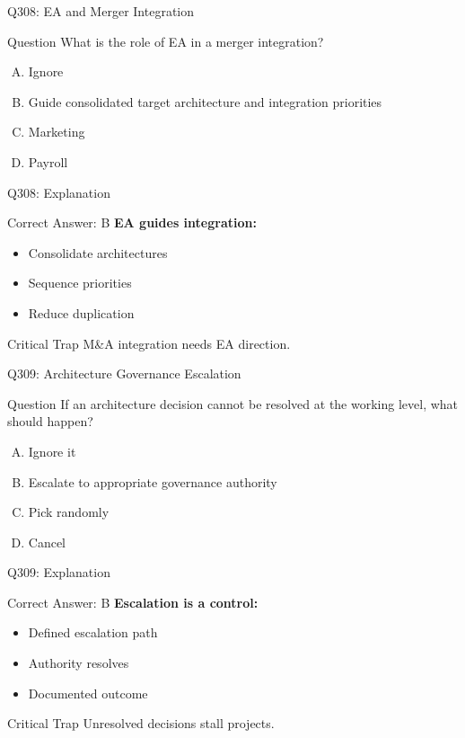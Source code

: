 \documentclass{beamer}
\begin{document}
	\begin{frame}{Q308: EA and Merger Integration}
		\begin{block}{Question}
			What is the role of EA in a merger integration?
		\end{block}
		\begin{enumerate}[(A)]
			\item Ignore
			\item Guide consolidated target architecture and integration priorities
			\item Marketing
			\item Payroll
		\end{enumerate}
	\end{frame}
	
	\begin{frame}{Q308: Explanation}
		\begin{block}{Correct Answer: B}
			\textbf{EA guides integration:}
			\begin{itemize}
				\item Consolidate architectures
				\item Sequence priorities
				\item Reduce duplication
			\end{itemize}
		\end{block}
		\begin{alertblock}{Critical Trap}
			M\&A integration needs EA direction.
		\end{alertblock}
	\end{frame}
	
	\begin{frame}{Q309: Architecture Governance Escalation}
		\begin{block}{Question}
			If an architecture decision cannot be resolved at the working level, what should happen?
		\end{block}
		\begin{enumerate}[(A)]
			\item Ignore it
			\item Escalate to appropriate governance authority
			\item Pick randomly
			\item Cancel
		\end{enumerate}
	\end{frame}
	
	\begin{frame}{Q309: Explanation}
		\begin{block}{Correct Answer: B}
			\textbf{Escalation is a control:}
			\begin{itemize}
				\item Defined escalation path
				\item Authority resolves
				\item Documented outcome
			\end{itemize}
		\end{block}
		\begin{alertblock}{Critical Trap}
			Unresolved decisions stall projects.
		\end{alertblock}
	\end{frame}
	
\end{document}
